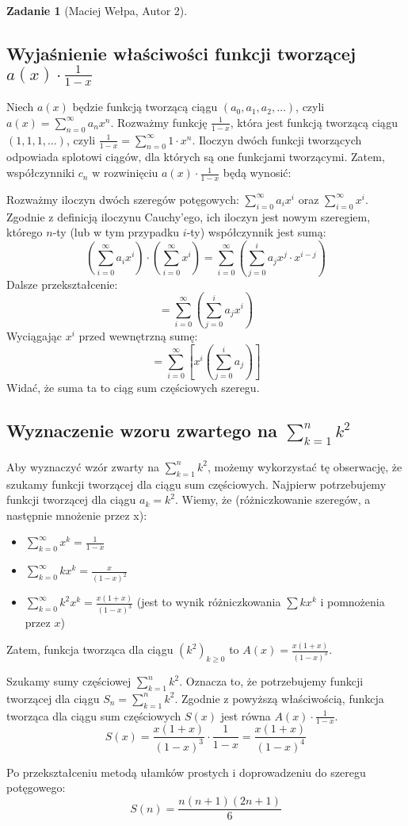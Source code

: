 \documentclass{mwart}
\newtheorem{zad}{Zadanie}[section]
\begin{document}
\begin{zad}[Maciej Wełpa, Autor 2]
\end{zad}
\begin{mdframed}
    \subsection*{Wyjaśnienie właściwości funkcji tworzącej $a(x) \cdot \frac{1}{1-x}$}
Niech $a(x)$ będzie funkcją tworzącą ciągu $(a_0, a_1, a_2, \ldots)$, czyli $a(x) = \sum_{n=0}^{\infty} a_n x^n$.
Rozważmy funkcję $\frac{1}{1-x}$, która jest funkcją tworzącą ciągu $(1, 1, 1, \ldots)$, czyli $\frac{1}{1-x} = \sum_{n=0}^{\infty} 1 \cdot x^n$.
Iloczyn dwóch funkcji tworzących odpowiada splotowi ciągów, dla których są one funkcjami tworzącymi. 
Zatem, współczynniki $c_n$ w rozwinięciu $a(x) \cdot \frac{1}{1-x}$ będą wynosić:

Rozważmy iloczyn dwóch szeregów potęgowych: $\sum_{i=0}^{\infty} a_i x^i$ oraz $\sum_{i=0}^{\infty} x^i$.
Zgodnie z definicją iloczynu Cauchy'ego, ich iloczyn jest nowym szeregiem, którego $n$-ty (lub w tym przypadku $i$-ty) współczynnik jest sumą:
$$ \left( \sum_{i=0}^{\infty} a_i x^i \right) \cdot \left( \sum_{i=0}^{\infty} x^i \right) = \sum_{i=0}^{\infty} \left( \sum_{j=0}^{i} a_j x^j \cdot x^{i-j} \right) $$
Dalsze przekształcenie:
$$ = \sum_{i=0}^{\infty} \left( \sum_{j=0}^{i} a_j x^i \right) $$
Wyciągając $x^i$ przed wewnętrzną sumę:
$$ = \sum_{i=0}^{\infty} \left[ x^i \left( \sum_{j=0}^{i} a_j \right) \right] $$
Widać, że suma ta to ciąg sum częściowych szeregu.

\subsection*{Wyznaczenie wzoru zwartego na $\sum_{k=1}^n k^2$}
Aby wyznaczyć wzór zwarty na $\sum_{k=1}^n k^2$, możemy wykorzystać tę obserwację, że szukamy funkcji tworzącej dla ciągu sum częściowych.
Najpierw potrzebujemy funkcji tworzącej dla ciągu $a_k = k^2$.
Wiemy, że (różniczkowanie szeregów, a następnie mnożenie przez x):
\begin{itemize}
    \item $\sum_{k=0}^{\infty} x^k = \frac{1}{1-x}$
    \item $\sum_{k=0}^{\infty} k x^k = \frac{x}{(1-x)^2}$
    \item $\sum_{k=0}^{\infty} k^2 x^k = \frac{x(1+x)}{(1-x)^3}$ (jest to wynik różniczkowania $\sum kx^k$ i pomnożenia przez $x$)
\end{itemize}
Zatem, funkcja tworząca dla ciągu $(k^2)_{k \ge 0}$ to $A(x) = \frac{x(1+x)}{(1-x)^3}$.

Szukamy sumy częściowej $\sum_{k=1}^n k^2$. Oznacza to, że potrzebujemy funkcji tworzącej dla ciągu $S_n = \sum_{k=1}^n k^2$.
Zgodnie z powyższą właściwością, funkcja tworząca dla ciągu sum częściowych $S(x)$ jest równa $A(x) \cdot \frac{1}{1-x}$.
$$S(x) = \frac{x(1+x)}{(1-x)^3} \cdot \frac{1}{1-x} = \frac{x(1+x)}{(1-x)^4}$$

Po przekształceniu metodą ułamków prostych i doprowadzeniu do szeregu potęgowego:
$$S(n) = \frac{n(n+1)(2n+1)}{6}$$

\end{mdframed}
\end{document}

